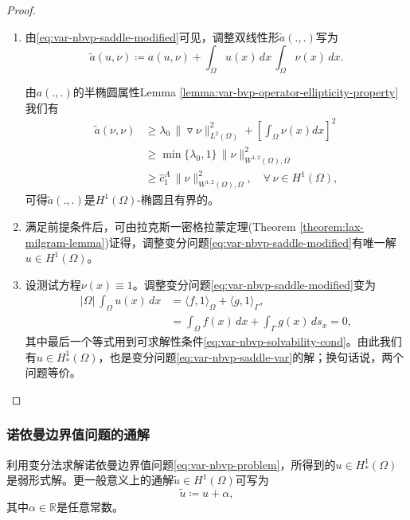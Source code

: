 \begin{proof}
  \begin{enumerate}
  \item 由\eqref{eq:var-nbvp-saddle-modified}可见，调整双线性形$\widetilde{a}(.,.)$写为
  \begin{equation*}
    \widetilde{a}(u,\nu) \coloneqq a(u,\nu) + \int_{\Omega} u(x) \, dx \, \int_{\Omega} \nu(x) \, dx.
  \end{equation*}

  由$a(.,.)$的半椭圆属性Lemma \ref{lemma:var-bvp-operator-ellipticity-property}我们有
  \begin{equation}
    \label{eq:var-nbvp-modified-ellipticity}
  \begin{split}
      \widetilde{a}(\nu,\nu) &\ge \lambda_0 \, \big\| \triangledown \nu \big\|_{L^{2}(\Omega)}^2 + \left[ \int_{\Omega} \nu(x) dx \right]^2\\
      &\ge \min\{\lambda_0, 1\} \, \big\| \nu \big\|_{W^{1,2}(\Omega), \Omega}^2 \\
      & \ge \hat{c}_1^A \, \big\| \nu \big\|_{W^{1,2}(\Omega), \Omega}^2, \quad \forall \, \nu \in H^{1}(\Omega),
  \end{split}
  \end{equation}
  可得$\widetilde{a}(.,.)$是$H^{1}(\Omega)$-椭圆且有界的。

  \item 满足前提条件后，可由拉克斯一密格拉蒙定理(Theorem \ref{theorem:lax-milgram-lemma})证得，调整变分问题\eqref{eq:var-nbvp-saddle-modified}有唯一解$u \in H^{1}(\Omega)$。

  \item 设测试方程$\nu(x) \equiv 1$。调整变分问题\eqref{eq:var-nbvp-saddle-modified}变为
  \begin{equation*}
    \begin{split}
      \big| \Omega \big| \, \int_{\Omega} u(x) \, dx &=
      \langle f, 1 \rangle_{\Omega}
      + \langle g, 1 \rangle_{\Gamma}, \\
      & = \int_{\Omega} f(x) \, d x + \int_{\Gamma} g(x) \, d s_x = 0,
    \end{split}
  \end{equation*}
  其中最后一个等式用到可求解性条件\eqref{eq:var-nbvp-solvability-cond}。由此我们有$u \in H_{*}^{1}(\Omega)$，也是变分问题\eqref{eq:var-nbvp-saddle-var}的解；换句话说，两个问题等价。
\end{enumerate}
\end{proof}

\subsubsection{诺依曼边界值问题的通解}
利用变分法求解诺依曼边界值问题\eqref{eq:var-nbvp-problem}，所得到的$u \in H_{*}^{1}(\Omega)$是弱形式解。更一般意义上的通解$\widetilde{u} \in H^{1}(\Omega)$可写为
\begin{equation*}
  \widetilde{u} \coloneqq u + \alpha,
\end{equation*}
其中$\alpha \in \mathbb{R}$是任意常数。



